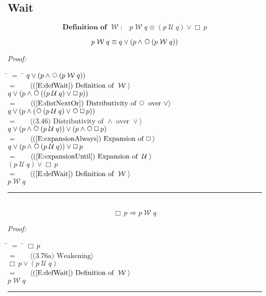 \documentclass[fleqn, leqno]{article}
\newcommand{\lgap}{2pt} %
\newcommand{\mymathindent}{24pt} %
\newcommand{\Until}{\;\mathcal{U}\;}
\newcommand{\Wait}{\;\mathcal{W}\;}
\newcommand{\Next}{\;\,\text{\raisebox{3.5pt}{\circle{6}}}}
\newcommand{\Always}{\Box\,}
\newcommand{\myqed}{\hfill\rule[-.23ex]{1.2ex}{2.0ex}}
\newcommand{\Gll} {\langle} %
\newcommand{\Ggg} {\rangle} %
\newcommand{\Hint}[1] {\ \ \ $\Gll \mbox{#1} \Ggg$ } %
\begin{document}
\subsection{Wait}

\begin{equation}\label{E:defWait}
\textbf{Definition of $\Wait$:}\quad p \Wait q \equiv (p \Until q) \lor \Always p
\end{equation}


\begin{equation}\label{E:expansionWait}
p \Wait q \equiv q \lor (p \land \Next (p \Wait q))
\end{equation}

\emph{Proof:}
\begin{tabbing}
\hspace{\mymathindent} \= $= \;$ \= \kill
\> \> $q \lor (p \land \Next (p \Wait q))$\\[\lgap]
\> $=$ \> \Hint{(\ref{E:defWait}) Definition of $\Wait$} \\[\lgap]
\> \> $q \lor (p \land \Next ((p \Until q) \lor \Always p))$\\[\lgap]
\> $=$ \> \Hint{(\ref{E:distNextOr}) Distributivity of $\Next$ over $\lor$} \\[\lgap]
\> \> $q \lor (p \land (\Next (p \Until q) \lor \Next\Always p))$\\[\lgap]
\> $=$ \> \Hint{(3.46) Distributivity of $\land$ over $\lor$}\\[\lgap]
\> \> $q \lor (p \land \Next(p \Until q)) \lor (p \land \Next\Always p)$\\[\lgap]
\> $=$ \> \Hint{(\ref{E:expansionAlways}) Expansion of $\Always$}\\[\lgap]
\> \> $q \lor (p \land \Next(p \Until q)) \lor \Always p$\\[\lgap]
\> $=$ \> \Hint{(\ref{E:expansionUntil}) Expansion of $\Until$}\\[\lgap]
\> \> $(p \Until q) \lor \Always p$\\[\lgap]
\> $=$ \> \Hint{(\ref{E:defWait}) Definition of $\Wait$} \\[\lgap]
\> \> $p \Wait q$\\[\lgap]
\end{tabbing}
\myqed\\[\lgap]


\begin{equation}\label{E:alwaysImpWait}
\Always p \Rightarrow p \Wait q
\end{equation}

\emph{Proof:}
\begin{tabbing}
\hspace{\mymathindent} \= $= \;$ \= \kill
\> \> $\Always p$\\[\lgap]
\> $=$ \> \Hint{(3.76a) Weakening} \\[\lgap]
\> \> $\Always p \lor (p \Until q)$\\[\lgap]
\> $=$ \> \Hint{(\ref{E:defWait}) Definition of $\Wait$} \\[\lgap]
\> \> $p \Wait q$\\[\lgap]
\end{tabbing}
\myqed\\[\lgap]
\end{document}
